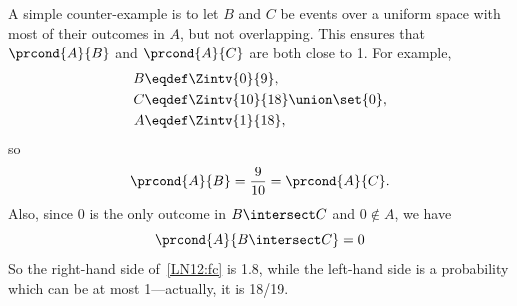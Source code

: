 A simple counter-example is to let $B$ and $C$ be events over a
uniform space with most of their outcomes in $A$, but not overlapping.
This ensures that $\prcond{A}{B}$ and $\prcond{A}{C}$ are both close
to 1.  For example,
\begin{align*}
B & \eqdef \Zintv{0}{9},\\
C & \eqdef \Zintv{10}{18} \union \set{0},\\
A & \eqdef \Zintv{1}{18},
\end{align*}
so
\[
\prcond{A}{B} = \frac{9}{10} = \prcond{A}{C}.
\]
Also, since 0 is the only outcome in $B \intersect C$ and $0 \notin
A$, we have
\[
\prcond{A}{B \intersect C} = 0
\]
So the right-hand side of~\eqref{LN12:fc} is 1.8, while the left-hand
side is a probability which can be at most 1---actually, it is 18/19.

\begin{problems}
\practiceproblems
{}

\classproblems
{}

\homeworkproblems
{}

\examproblems
{}
\end{problems}

